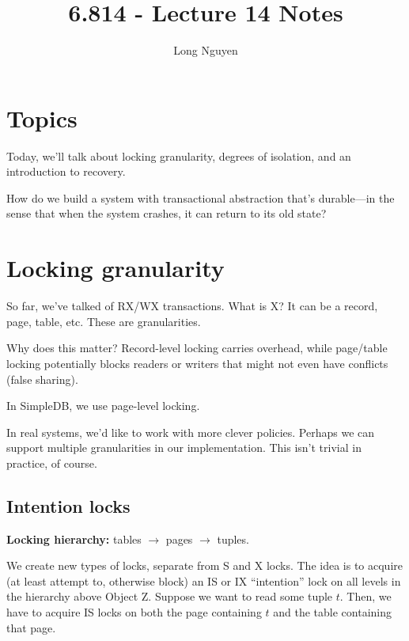 \documentclass{article}
\title{6.814 - Lecture 14 Notes}
\author{Long Nguyen}
\begin{document}
\maketitle

\section{Topics}
Today, we'll talk about locking granularity, degrees of isolation, and an introduction to recovery.

How do we build a system with transactional abstraction that's durable---in the sense that when the system crashes, it can return to its old state?

\section{Locking granularity}

So far, we've talked of RX/WX transactions. What is X? It can be a record, page, table, etc. These are granularities.

Why does this matter? Record-level locking carries overhead, while page/table locking potentially blocks readers or writers that might not even have conflicts (false sharing).

In SimpleDB, we use page-level locking.

In real systems, we'd like to work with more clever policies. Perhaps we can support multiple granularities in our implementation. This isn't trivial in practice, of course.

\subsection{Intention locks}

\textbf{Locking hierarchy:} tables $\rightarrow$ pages $\rightarrow$ tuples.

We create new types of locks, separate from S and X locks. The idea is to acquire (at least attempt to, otherwise block) an IS or IX ``intention'' lock on all levels in the hierarchy above Object Z. Suppose we want to read some tuple $t$. Then, we have to acquire IS locks on both the page containing $t$ and the table containing that page.
\end{document}
